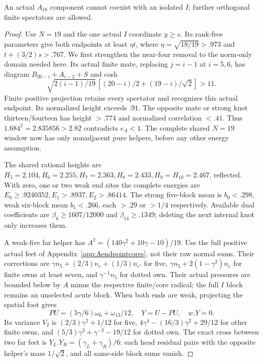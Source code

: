 \begin{lemma}\label{app:tail:lem:A18I}
An actual $A_{18}$ component cannot coexist with an isolated $I$;
further orthogonal finite spectators are allowed.
\end{lemma}
\begin{proof}
Use $N=19$ and the one actual $I$ coordinate $y\ge s$.
Its rank-free parameters give both endpoints at least $\eta t$,
where $\eta=\sqrt{18/19}>.973$ and $t+(3/2)s>.767$.
We first strengthen the near-four removal to the norm-only
domain needed here. Its actual finite mate, replacing $j=i-1$
at $i=5,6$, has diagram $B_{20-i}+A_{i-2}+S$ and cosh
\[
 \sqrt{2(i-1)/19}\,[(20-i)/2+(19-i)/\sqrt2]>11.
\]
Finite positive projection retains every spectator and recognizes
this actual endpoint. Its normalized height exceeds $.91$.
The opposite mate or strong knot thirteen/fourteen has height
$>.774$ and normalized correlation $<.41$.
Thus $1.684^2=2.835856>2.82$ contradicts $e_A<1$.
The complete shared $N=19$ window now has only nonadjacent pure
helpers, before any other energy assumption.

The shared rational heights are
$H_5=2.104,H_6=2.255,H_7=2.363,H_8=2.433,H_9=H_{10}=2.467$,
reflected. With zero, one or two weak end sites the complete
energies are $E_0\ge.9240352,E_1>.8937,E_2>.86414$.
The strong five-block mean is $b_0<.298$, weak six-block
mean $b_1<.266$, each $>.29$ or $>1/4$ respectively.
Available dual coefficients are
$\beta_6\ge1607/12000$ and $\beta_{14}\ge.1349$;
deleting the next internal knot only increases them.

A weak-five far helper has
$A^2=(140\gamma^2+10\gamma-10)/19$.
Use the full positive actual feet of Appendix~\ref{app:Aendpointcores},
not their raw normal sums. Their corrections are
$\gamma n_5+(2/3)n_e+(1/3)n_{e'}$ for five,
$\gamma n_5+2(1-\gamma^2)n_e$ for finite owns at least seven,
and $\gamma^{-1}n_5$ for dotted own.
Their actual pressures are bounded below by $A$ minus the
respective finite/core radical; the full $I$ block remains
an unselected acute block.
When both ends are weak, projecting the spatial foot gives
\[
 PU=(5\gamma/6)\omega_6+\omega_{13}/12,
 \quad Y=U-PU,\quad w.Y=0.
\]
Its variance $V_2$ is
$(2/3)\gamma^2+1/12$ for five,
$4\gamma^4-(16/3)\gamma^2+29/12$ for other finite owns,
and $(5/3)\gamma^2+\gamma^{-2}-19/12$ for dotted own.
The exact cross between two far feet is
$Y_L.Y_R=(\gamma_L+\gamma_R)/6$: each head residual
pairs with the opposite helper's mass $1/\sqrt2$, and all
same-side block sums vanish.


\end{proof}
